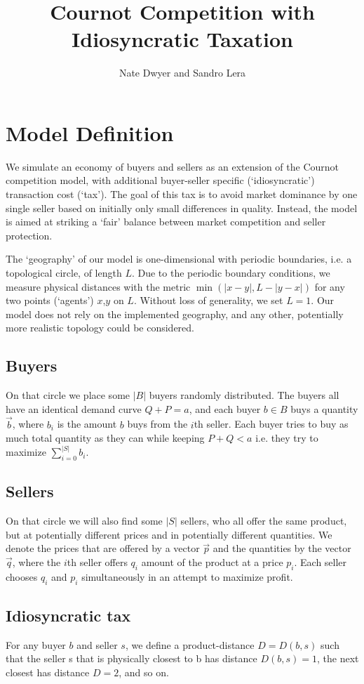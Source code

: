 \documentclass[11pt]{article}
\title{Cournot Competition with Idiosyncratic Taxation}
\author{Nate Dwyer and Sandro Lera}
\begin{document}
\maketitle
\setcounter{section}{0}
\section{Model Definition}
We simulate an economy of buyers and sellers as an extension of the Cournot competition model, 
with additional buyer-seller specific (`idiosyncratic') transaction cost (`tax'). 
The goal of this tax is to avoid market dominance by one single seller based on initially only small differences in quality. 
Instead, the model is aimed at striking a `fair' balance between market competition and seller protection. 

The `geography' of our model is one-dimensional with periodic boundaries, i.e. a topological circle, of length $L$. 
Due to the periodic boundary conditions, we measure physical distances with the metric $\min(|x-y|, L-|y-x|)$ for any two points (`agents') $x$,$y$ on $L$. 
Without loss of generality, we set $L=1$. 
Our model does not rely on the implemented geography, and any other, potentially more realistic topology could be considered. 

\subsection{Buyers}
On that circle we place some $|B|$ buyers randomly distributed. The buyers all
have an identical demand curve $Q+P = a$, and each buyer $b\in B$ buys a quantity
$\vec{b}$, where $b_i$ is the amount $b$ buys from the $i$th seller. Each buyer
tries to buy as much total quantity as they can while keeping $P + Q < a$ i.e.
they try to maximize $\sum_{i=0}^{|S|}b_i$. 

\subsection{Sellers}
On that circle we will also find some $|S|$ sellers, who all offer the same
product, but at potentially different prices and in potentially different
quantities. We denote the prices that are offered by a vector $\vec{p}$ and the
quantities by the vector $\vec{q}$, where the $i$th seller offers $q_i$ amount
of the product at a price $p_i$. Each seller chooses $q_i$ and $p_i$
simultaneously in an attempt to maximize profit.  

\subsection{Idiosyncratic tax}
For any buyer $b$ and seller $s$, we define a product-distance $D = D(b,s)$ such
that the seller s that is physically closest to b has distance $D(b,s)=1$, the
next closest has distance $D=2$, and so on. 
\end{document}
